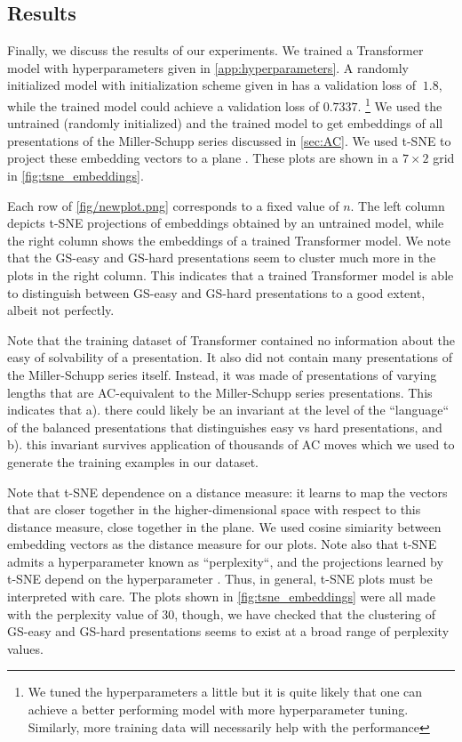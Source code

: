 \subsection{Results\label{sec:transformer_results}}
Finally, we discuss the results of our experiments. We trained a Transformer model with hyperparameters given in  \autoref{app:hyperparameters}. A randomly initialized model with initialization scheme given in \cite{Radford2019LanguageMA} has a validation loss of $~1.8$, while the trained model could achieve a validation loss of $0.7337$.
\footnote{We tuned the hyperparameters a little but it is quite likely that one can achieve a better performing model with more hyperparameter tuning. Similarly, more training data will necessarily help with the performance}
We used the untrained (randomly initialized) and the trained model to get embeddings of all presentations of the Miller-Schupp series discussed in \autoref{sec:AC}. We used t-SNE to project these embedding vectors to a plane \cite{JMLR:v9:vandermaaten08a}. These plots are shown in a $7 \times 2$ grid in \autoref{fig:tsne_embeddings}.

Each row of \autoref{fig/newplot.png} corresponds to a fixed value of $n$. The left column depicts t-SNE projections of embeddings obtained by an untrained model, while the right column shows the embeddings of a trained Transformer model. We note that the GS-easy and GS-hard presentations seem to cluster much more in the plots in the right column. This indicates that a trained Transformer model is able to distinguish between GS-easy and GS-hard presentations to a good extent, albeit not perfectly. 

Note that the training dataset of Transformer contained no information about the easy of solvability of a presentation. It also did not contain many presentations of the Miller-Schupp series itself. Instead, it was made of presentations of varying lengths that are AC-equivalent to the Miller-Schupp series presentations. This indicates that a). there could likely be an invariant at the level of the ``language`` of the balanced presentations that distinguishes easy vs hard presentations, and b). this invariant survives application of thousands of AC moves which we used to generate the 
training examples in our dataset. 

 Note that t-SNE dependence on a distance measure: it learns to map the vectors that are closer together in the higher-dimensional space with respect to this distance measure, close together in the plane. We used cosine simiarity between embedding vectors as the distance measure for our plots. Note also that t-SNE admits a hyperparameter known as ``perplexity``, and the projections learned by t-SNE depend on the hyperparameter \cite{wattenberg2016how}. Thus, in general, t-SNE plots must be interpreted with care. The plots shown in \autoref{fig:tsne_embeddings} were all made with the perplexity value of $30$, though, we have checked that the clustering of GS-easy and GS-hard presentations seems to exist at a broad range of perplexity values.




